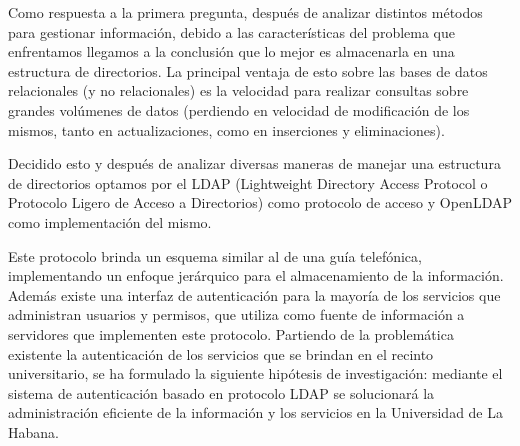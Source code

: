 \begin{introduction}
Como respuesta a la primera pregunta, después de analizar distintos métodos para gestionar información, debido a las características del problema que enfrentamos llegamos a la conclusión que lo mejor es almacenarla en una estructura de directorios. La principal ventaja de esto sobre las bases de datos relacionales (y no relacionales) es la velocidad para realizar consultas sobre grandes volúmenes de datos (perdiendo en velocidad de modificación de los mismos, tanto en actualizaciones, como en inserciones y eliminaciones).

\newpage

Decidido esto y después de analizar diversas maneras de manejar una estructura de directorios optamos por el LDAP (Lightweight Directory Access Protocol o Protocolo Ligero de Acceso a Directorios) como protocolo de acceso y OpenLDAP como implementación del mismo.

Este protocolo  brinda un esquema similar al de una guía telefónica, implementando un enfoque jerárquico para el almacenamiento de la información. Además existe una interfaz de autenticación para la mayoría de los servicios que administran usuarios y permisos, que utiliza como fuente de información a servidores que implementen este protocolo. 
Partiendo de la problemática existente la autenticación de los servicios que se brindan en el recinto universitario, se ha formulado la siguiente hipótesis de investigación: mediante el sistema de autenticación basado en protocolo LDAP se solucionará la administración eficiente de la información y los servicios en la Universidad de La Habana.


\end{introduction}
